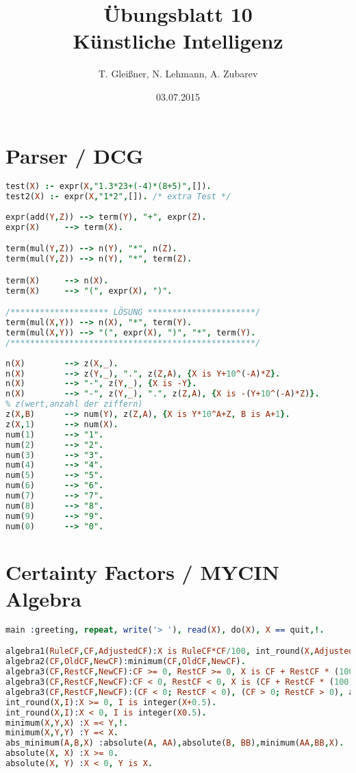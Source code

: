\documentclass[12pt]{article}
\title{\"Ubungsblatt 10\\ \glqq K\"unstliche Intelligenz\grqq}
\author{T. Glei\ss ner, N. Lehmann, A. Zubarev}
\date{03.07.2015}
\begin{document}
\maketitle
\tableofcontents
\newpage

\section{Parser / DCG}

\begin{lstlisting}[language=Prolog]
test(X) :- expr(X,"1.3*23+(-4)*(8+5)",[]).
test2(X) :- expr(X,"1*2",[]). /* extra Test */
 
expr(add(Y,Z)) --> term(Y), "+", expr(Z).
expr(X)     --> term(X).

term(mul(Y,Z)) --> n(Y), "*", n(Z).
term(mul(Y,Z)) --> n(Y), "*", term(Z).

term(X)     --> n(X).
term(X)     --> "(", expr(X), ")".

/******************** LÖSUNG **********************/
term(mul(X,Y)) --> n(X), "*", term(Y).
term(mul(X,Y)) --> "(", expr(X), ")", "*", term(Y).
/**************************************************/
 
n(X)        --> z(X,_).
n(X)        --> z(Y,_), ".", z(Z,A), {X is Y+10^(-A)*Z}.
n(X)        --> "-", z(Y,_), {X is -Y}.
n(X)        --> "-", z(Y,_), ".", z(Z,A), {X is -(Y+10^(-A)*Z)}.
% z(wert,anzahl der ziffern)
z(X,B)      --> num(Y), z(Z,A), {X is Y*10^A+Z, B is A+1}.
z(X,1)      --> num(X).
num(1)      --> "1".
num(2)      --> "2".
num(3)      --> "3".
num(4)      --> "4".
num(5)      --> "5".
num(6)      --> "6".
num(7)      --> "7".
num(8)      --> "8".
num(9)      --> "9".
num(0)      --> "0".
\end{lstlisting}

\newpage

\section{Certainty Factors / MYCIN Algebra}

\begin{lstlisting}[language=Prolog]
main :greeting, repeat, write('> '), read(X), do(X), X == quit,!.

algebra1(RuleCF,CF,AdjustedCF):X is RuleCF*CF/100, int_round(X,AdjustedCF).
algebra2(CF,OldCF,NewCF):minimum(CF,OldCF,NewCF).
algebra3(CF,RestCF,NewCF):CF >= 0, RestCF >= 0, X is CF + RestCF * (100 CF) / 100, int_round(X,NewCF).
algebra3(CF,RestCF,NewCF):CF < 0, RestCF < 0, X is (CF + RestCF * (100 + CF) / 100), int_round(X,NewCF).
algebra3(CF,RestCF,NewCF):(CF < 0; RestCF < 0), (CF > 0; RestCF > 0), abs_minimum(CF,RestCF,MCF), X is 100 * (CF + RestCF) / (100 MCF), int_round(X,NewCF).
int_round(X,I):X >= 0, I is integer(X+0.5).
int_round(X,I):X < 0, I is integer(X0.5).
minimum(X,Y,X) :X =< Y,!.
minimum(X,Y,Y) :Y =< X.
abs_minimum(A,B,X) :absolute(A, AA),absolute(B, BB),minimum(AA,BB,X).
absolute(X, X) :X >= 0.
absolute(X, Y) :X < 0, Y is X.
\end{lstlisting}
\end{document}
